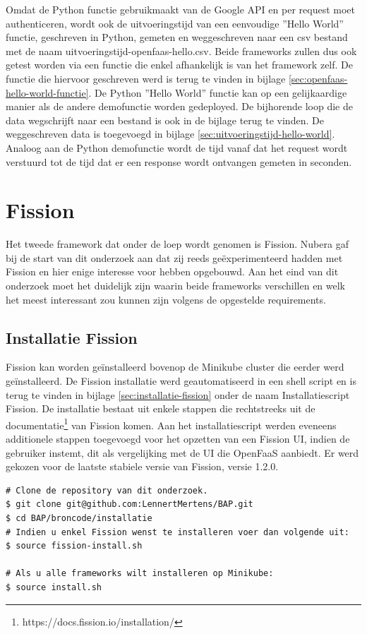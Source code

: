 Omdat de Python functie gebruikmaakt van de Google API en per request moet authenticeren, wordt ook de uitvoeringstijd van een eenvoudige ''Hello World'' functie, geschreven in Python, gemeten en weggeschreven naar een csv bestand met de naam uitvoeringstijd-openfaas-hello.csv. Beide frameworks zullen dus ook getest worden via een functie die enkel afhankelijk is van het framework zelf. De functie die hiervoor geschreven werd is terug te vinden in bijlage \ref{sec:openfaas-hello-world-functie}. De Python ''Hello World'' functie kan op een gelijkaardige manier als de andere demofunctie worden gedeployed. De bijhorende loop die de data wegschrijft naar een bestand is ook in de bijlage terug te vinden. De weggeschreven data is toegevoegd in bijlage \ref{sec:uitvoeringstijd-hello-world}. Analoog aan de Python demofunctie wordt de tijd vanaf dat het request wordt verstuurd tot de tijd dat er een response wordt ontvangen gemeten in seconden.

\newpage
\section{Fission}
Het tweede framework dat onder de loep wordt genomen is Fission. Nubera gaf bij de start van dit onderzoek aan dat zij reeds geëxperimenteerd hadden met Fission en hier enige interesse voor hebben opgebouwd. Aan het eind van dit onderzoek moet het duidelijk zijn waarin beide frameworks verschillen en welk het meest interessant zou kunnen zijn volgens de opgestelde requirements.

\subsection{Installatie Fission}
Fission kan worden geïnstalleerd bovenop de Minikube cluster die eerder werd geïnstalleerd. De Fission installatie werd geautomatiseerd in een shell script en is terug te vinden in bijlage \ref{sec:installatie-fission} onder de naam Installatiescript Fission. De installatie bestaat uit enkele stappen die rechtstreeks uit de documentatie\footnote{https://docs.fission.io/installation/} van Fission komen. Aan het installatiescript werden eveneens additionele stappen toegevoegd voor het opzetten van een Fission UI, indien de gebruiker instemt, dit als vergelijking met de UI die OpenFaaS aanbiedt. Er werd gekozen voor de laatste stabiele versie van Fission, versie 1.2.0.

\begin{lstlisting}
# Clone de repository van dit onderzoek.
$ git clone git@github.com:LennertMertens/BAP.git
$ cd BAP/broncode/installatie
# Indien u enkel Fission wenst te installeren voer dan volgende uit:
$ source fission-install.sh

# Als u alle frameworks wilt installeren op Minikube:
$ source install.sh
\end{lstlisting}

